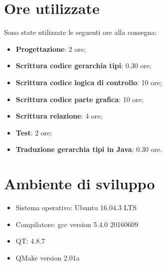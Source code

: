 \documentclass[a4paper,10pt]{article}
\begin{document}
            \section{Ore utilizzate}
            Sono state utilizzate le seguenti ore alla consegna:
            \begin{itemize}
                \item \textbf{Progettazione}: 2 ore;
                \item \textbf{Scrittura codice gerarchia tipi}: 0.30 ore;
                \item \textbf{Scrittura codice logica di controllo}: 10 ore;
                \item \textbf{Scrittura codice parte grafica}: 10 ore;
                \item \textbf{Scrittura relazione}: 4 ore;
                \item \textbf{Test}: 2 ore;
                \item \textbf{Traduzione gerarchia tipi in Java}: 0.30 ore.
    
            \end{itemize}
            \section{Ambiente di sviluppo}
            \begin{itemize}
                \item Sistema operativo: Ubuntu 16.04.3 LTS
                \item Compilatore: gcc version 5.4.0 20160609
                \item QT: 4.8.7
                \item QMake version 2.01a
            \end{itemize}
    
\end{document}
